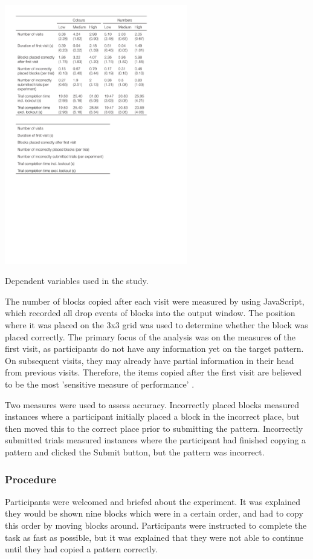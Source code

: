  \begin{table}[htp]
\centering
 \includegraphics[width=0.6\textwidth]{images/ch34/ch34-3_DVs.pdf}
    \caption[Study 3 dependent variables]{Dependent variables used in the study.}
    \label{table:ch4_dvs}
\end{table}

The number of blocks copied after each visit were measured by using JavaScript, which recorded all drop events of blocks into the output window. The position where it was placed on the 3x3 grid was used to determine whether the block was placed correctly.
The primary focus of the analysis was on the measures of the first visit, as participants do not have any information yet on the target pattern. On subsequent visits, they may already have partial information in their head from previous visits. Therefore, the items copied after the first visit are believed to be the most 'sensitive measure of performance' \citep{Janssen2012}. 

Two measures were used to assess accuracy. Incorrectly placed blocks measured instances where a participant initially placed a block in the incorrect place, but then moved this to the correct place prior to submitting the pattern. Incorrectly submitted trials measured instances where the participant had finished copying a pattern and clicked the Submit button, but the pattern was incorrect.

\subsubsection{Procedure}
Participants were welcomed and briefed about the experiment. It was explained they would be shown nine blocks which were in a certain order, and had to copy this order by moving blocks around. Participants were instructed to complete the task as fast as possible, but it was explained that they were not able to continue until they had copied a pattern correctly. 

